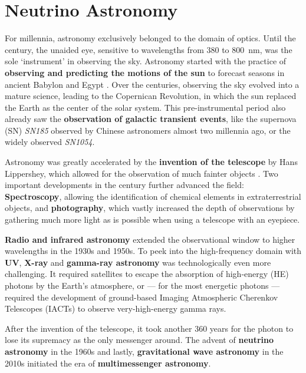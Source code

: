 \chapter{Neutrino Astronomy}\label{theory}

For millennia, astronomy exclusively belonged to the domain of optics. Until the  century, the unaided eye, sensitive to wavelengths from \num{380} to \SI{800}{\nano\m}, was the sole `instrument'  in observing the sky. Astronomy started with the practice of \textbf{observing and predicting the motions of the sun} to forecast seasons in ancient Babylon and Egypt . Over the centuries, observing the sky evolved into a mature science, leading to the Copernican Revolution, in which the sun replaced the Earth as the center of the solar system. This pre-instrumental period also already saw the \textbf{observation of galactic transient events}, like the supernova (SN) \emph{SN185} observed by Chinese astronomers almost two millennia ago, or the widely observed \emph{SN1054}.

Astronomy was greatly accelerated by the \textbf{invention of the telescope} by Hans Lippershey, which allowed for the observation of much fainter objects . Two important developments in the  century further advanced the field: \textbf{Spectroscopy}, allowing the identification of chemical elements in extraterrestrial objects, and \textbf{photography}, which vastly increased the depth of observations by gathering much more light as is possible when using a telescope with an eyepiece.

\textbf{Radio and infrared astronomy} extended the observational window to higher wavelengths in the 1930s and 1950s. To peek into the high-frequency domain with \textbf{UV}, \textbf{X-ray} and \textbf{gamma-ray astronomy} was technologically even more challenging. It required satellites to escape the absorption of high-energy (HE) photons by the Earth's atmosphere, or --- for the most energetic photons --- required the development of ground-based Imaging Atmospheric Cherenkov Telescopes (IACTs) to observe very-high-energy gamma rays.

After the invention of the telescope, it took another 360 years for the photon to lose its supremacy as the only messenger around. The advent of \textbf{neutrino astronomy} in the 1960s and lastly, \textbf{gravitational wave astronomy} in the 2010s initiated the era of \textbf{multimessenger astronomy}.


